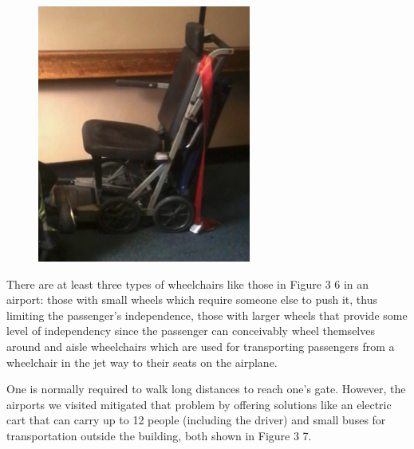 \begin{list}{-}{}
\begin{figure}[h]
     \includegraphics[width=7cm]{images/image036}
  \label{fig:36}
\end{figure}

  \item There are at least three types of wheelchairs like those in Figure 3 6 in an airport: those with small wheels which require someone else to push it, thus limiting the passenger’s independence, those with larger wheels that provide some level of independency since the passenger can conceivably wheel themselves around and aisle wheelchairs which are used for transporting passengers from a wheelchair in the jet way to their seats on the airplane.
  \item One is normally required to walk long distances to reach one’s gate. However, the airports we visited mitigated that problem by offering solutions like an electric cart that can carry up to 12 people (including the driver) and small buses for transportation outside the building, both shown in Figure 3 7.


\end{list}
